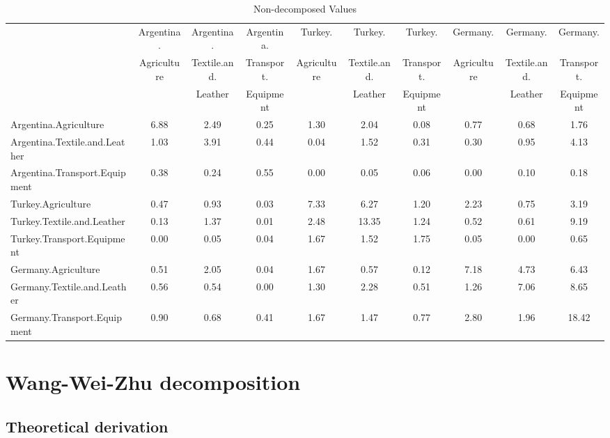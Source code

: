 \documentclass{article}\usepackage[]{graphicx}\usepackage[]{color}
\begin{document}
\begin{table}[htbp]\scriptsize
    \begin{adjustwidth}{-1.15in}{-1.15in} 
  \centering
  \caption{Non-decomposed Values}
    \begin{tabular}{lccccccccc}
    \toprule
         & Argentina. & Argentina. & Argentina. & Turkey. & Turkey. & Turkey. & Germany. & Germany. & Germany.\\
          & Agriculture & Textile.and. & Transport. & Agriculture & Textile.and. & Transport. & Agriculture & Textile.and. & Transport.\\
          & & Leather & Equipment & & Leather & Equipment & & Leather & Equipment\\
    \midrule
    Argentina.Agriculture & 6.88  & 2.49  & 0.25  & 1.30  & 2.04  & 0.08  & 0.77  & 0.68  & 1.76 \\
    Argentina.Textile.and.Leather & 1.03  & 3.91  & 0.44  & 0.04  & 1.52  & 0.31  & 0.30  & 0.95  & 4.13 \\
    Argentina.Transport.Equipment & 0.38  & 0.24  & 0.55  & 0.00  & 0.05  & 0.06  & 0.00  & 0.10  & 0.18 \\
    Turkey.Agriculture & 0.47  & 0.93  & 0.03  & 7.33  & 6.27  & 1.20  & 2.23  & 0.75  & 3.19 \\
    Turkey.Textile.and.Leather & 0.13  & 1.37  & 0.01  & 2.48  & 13.35 & 1.24  & 0.52  & 0.61  & 9.19 \\
    Turkey.Transport.Equipment & 0.00  & 0.05  & 0.04  & 1.67  & 1.52  & 1.75  & 0.05  & 0.00  & 0.65 \\
    Germany.Agriculture & 0.51  & 2.05  & 0.04  & 1.67  & 0.57  & 0.12  & 7.18  & 4.73  & 6.43 \\
    Germany.Textile.and.Leather & 0.56  & 0.54  & 0.00  & 1.30  & 2.28  & 0.51  & 1.26  & 7.06  & 8.65 \\
    Germany.Transport.Equipment & 0.90  & 0.68  & 0.41  & 1.67  & 1.47  & 0.77  & 2.80  & 1.96  & 18.42 \\
    \bottomrule
    \end{tabular}
  \label{tab:noleon}
        \end{adjustwidth}
\end{table}


\section{Wang-Wei-Zhu decomposition}

\subsection{Theoretical derivation}
\end{document}
